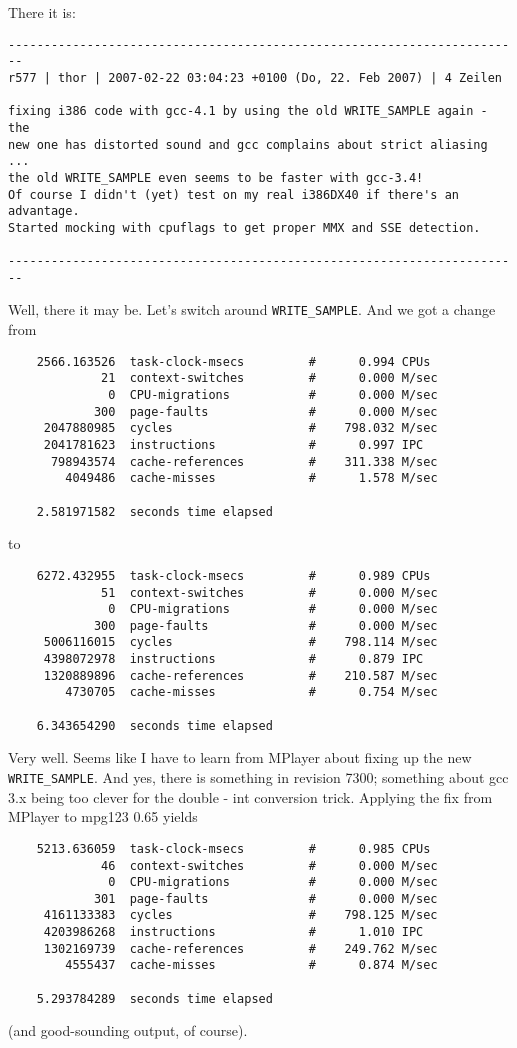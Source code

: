 \documentclass[a4paper,12pt]{scrartcl}
\begin{document}
There it is:
\begin{verbatim}
------------------------------------------------------------------------
r577 | thor | 2007-02-22 03:04:23 +0100 (Do, 22. Feb 2007) | 4 Zeilen

fixing i386 code with gcc-4.1 by using the old WRITE_SAMPLE again - the
new one has distorted sound and gcc complains about strict aliasing ...
the old WRITE_SAMPLE even seems to be faster with gcc-3.4!
Of course I didn't (yet) test on my real i386DX40 if there's an advantage.
Started mocking with cpuflags to get proper MMX and SSE detection.

------------------------------------------------------------------------
\end{verbatim}
Well, there it may be. Let's switch around \verb:WRITE_SAMPLE:. And we got a change from
\begin{verbatim}
    2566.163526  task-clock-msecs         #      0.994 CPUs 
             21  context-switches         #      0.000 M/sec
              0  CPU-migrations           #      0.000 M/sec
            300  page-faults              #      0.000 M/sec
     2047880985  cycles                   #    798.032 M/sec
     2041781623  instructions             #      0.997 IPC  
      798943574  cache-references         #    311.338 M/sec
        4049486  cache-misses             #      1.578 M/sec

    2.581971582  seconds time elapsed
\end{verbatim}
to
\begin{verbatim}
    6272.432955  task-clock-msecs         #      0.989 CPUs 
             51  context-switches         #      0.000 M/sec
              0  CPU-migrations           #      0.000 M/sec
            300  page-faults              #      0.000 M/sec
     5006116015  cycles                   #    798.114 M/sec
     4398072978  instructions             #      0.879 IPC  
     1320889896  cache-references         #    210.587 M/sec
        4730705  cache-misses             #      0.754 M/sec

    6.343654290  seconds time elapsed
\end{verbatim}
Very well. Seems like I have to learn from MPlayer about fixing up the new \verb:WRITE_SAMPLE:.
And yes, there is something in revision 7300; something about gcc 3.x being too clever for the double - int conversion trick. Applying the fix from MPlayer to mpg123 0.65 yields
\begin{verbatim}
    5213.636059  task-clock-msecs         #      0.985 CPUs 
             46  context-switches         #      0.000 M/sec
              0  CPU-migrations           #      0.000 M/sec
            301  page-faults              #      0.000 M/sec
     4161133383  cycles                   #    798.125 M/sec
     4203986268  instructions             #      1.010 IPC  
     1302169739  cache-references         #    249.762 M/sec
        4555437  cache-misses             #      0.874 M/sec

    5.293784289  seconds time elapsed
\end{verbatim}
(and good-sounding output, of course).
\end{document}
